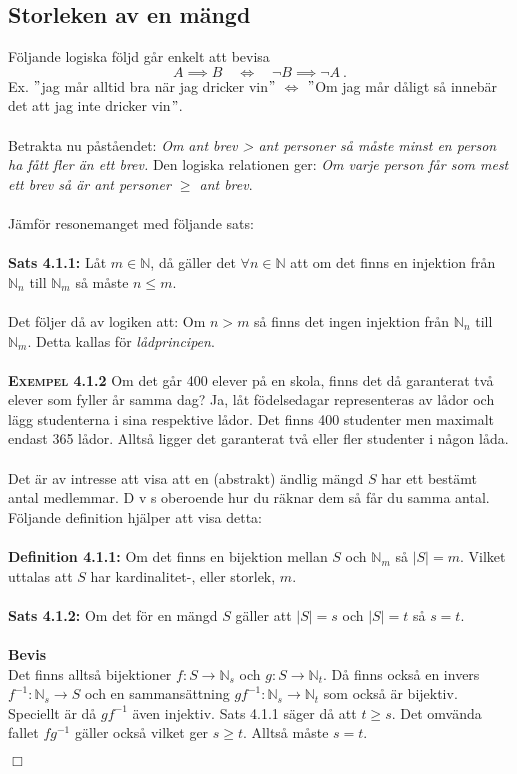 \documentclass{article}
\begin{document}
\subsection{Storleken av en mängd}
Följande logiska följd går enkelt att bevisa
$$
A\implies B \quad  \Longleftrightarrow \quad \neg B\implies \neg A \ .
$$
Ex. $"$jag mår alltid bra när jag dricker vin$"$ $\Longleftrightarrow$ $"$Om jag mår dåligt så innebär det att jag inte dricker vin$"$.
\\ \\
Betrakta nu påståendet: \textit{Om ant brev > ant personer så måste minst en person ha fått fler än ett brev.} Den logiska relationen ger: \textit{Om varje person får som mest ett brev så är ant personer $\geq$ ant brev}.\\ \\
Jämför resonemanget med följande sats:\\ \\
\textbf{Sats 4.1.1:} Låt $m\in\mathbb{N}$, då gäller det $\forall n\in\mathbb{N}$ att om det finns en injektion från $\mathbb{N}_n$ till $\mathbb{N}_m$ så måste $n\leq m$.\\ \\
Det följer då av logiken att: Om $n>m$ så finns det ingen injektion från $\mathbb{N}_n$ till $\mathbb{N}_m$. Detta kallas för \textit{lådprincipen}.
\\ \\
\textsc{\textbf{Exempel 4.1.2}} Om det går 400 elever på en skola, finns det då garanterat två elever som fyller år samma dag? Ja, låt födelsedagar representeras av lådor och lägg studenterna i sina respektive lådor. Det finns 400 studenter men maximalt endast 365 lådor. Alltså ligger det garanterat två eller fler studenter i någon låda.
\\ \\
Det är av intresse att visa att en (abstrakt) ändlig mängd $S$ har ett bestämt antal medlemmar. D v s oberoende hur du räknar dem så får du samma antal. Följande definition hjälper att visa detta:\\ \\
\textbf{Definition 4.1.1:} Om det finns en bijektion mellan $S$ och $\mathbb{N}_m$ så $|S|=m$. Vilket uttalas att $S$ har kardinalitet-, eller storlek, $m$.\\ \\
\textbf{Sats 4.1.2:} Om det för en mängd $S$ gäller att $|S|=s$ och $|S|=t$ så $s=t$.\\ \\
\textbf{Bevis}\\
Det finns alltså bijektioner $f:S\rightarrow\mathbb{N}_s$ och $g:S\rightarrow\mathbb{N}_t$. Då finns också en invers $f^{-1}:\mathbb{N}_s\rightarrow S$ och en sammansättning $gf^{-1}:\mathbb{N}_s\rightarrow\mathbb{N}_t$ som också är bijektiv. Speciellt är då $gf^{-1}$ även injektiv. Sats 4.1.1 säger då att $t\geq s$. Det omvända fallet $fg^{-1}$ gäller också vilket ger $s\geq t$. Alltså måste $s=t$.
\begin{flushright}
$\Box$
\end{flushright}
\end{document}
